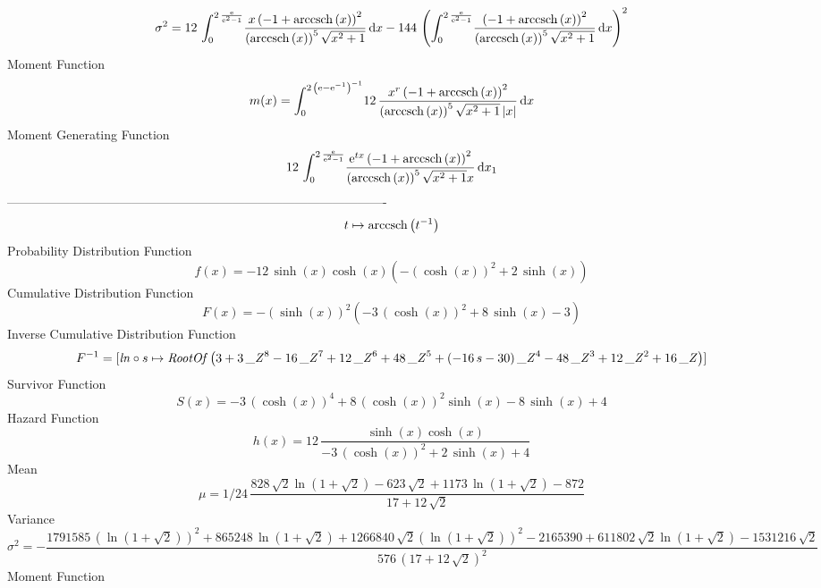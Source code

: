 \documentclass[12pt]{article}
\begin{document}
 $$ \sigma^2 = 12\,\int_{0}^{2\,{\frac {{\rm e}}{{{\rm e}^{2}}-1}}}\!{\frac {x
 \left( -1+{\rm arccsch} \left(x\right) \right) ^{2}}{ \left( 
{\rm arccsch} \left(x\right) \right) ^{5}\sqrt {{x}^{2}+1}}}\,{\rm d}x
-144\, \left( \int_{0}^{2\,{\frac {{\rm e}}{{{\rm e}^{2}}-1}}}\!{
\frac { \left( -1+{\rm arccsch} \left(x\right) \right) ^{2}}{ \left( 
{\rm arccsch} \left(x\right) \right) ^{5}\sqrt {{x}^{2}+1}}}\,{\rm d}x
 \right) ^{2}
$$Moment Function 
 $$ m(x) = \int_{0}^{2\, \left( {\rm e}-{{\rm e}^{-1}} \right) ^{-1}}\!12\,{
\frac {{x}^{r} \left( -1+{\rm arccsch} \left(x\right) \right) ^{2}}{
 \left( {\rm arccsch} \left(x\right) \right) ^{5}\sqrt {{x}^{2}+1}
 \left| x \right| }}\,{\rm d}x
$$ Moment Generating Function 
 $$12\,\int_{0}^{2\,{\frac {{\rm e}}{{{\rm e}^{2}}-1}}}\!{\frac {{{\rm e}
^{tx}} \left( -1+{\rm arccsch} \left(x\right) \right) ^{2}}{ \left( 
{\rm arccsch} \left(x\right) \right) ^{5}\sqrt {{x}^{2}+1}x}}\,{\rm d}
x_{{1}}
$$-------------------------------------------------------------------------------------------  \\$$t\mapsto {\rm arccsch} \left({t}^{-1}\right)
$$Probability Distribution Function 
$$  f(x)=-12\,\sinh \left( x \right) \cosh \left( x \right)  \left( - \left( 
\cosh \left( x \right)  \right) ^{2}+2\,\sinh \left( x \right) 
 \right) 
$$Cumulative Distribution Function  
 $$F(x)=- \left( \sinh \left( x \right)  \right) ^{2} \left( -3\, \left( \cosh
 \left( x \right)  \right) ^{2}+8\,\sinh \left( x \right) -3 \right) 
$$ Inverse Cumulative Distribution Function 
  $$F^{-1} = [{\it ln}\circ s\mapsto {\it RootOf} \left( 3+3\,{{\it \_Z}}^{8}-16\,{
{\it \_Z}}^{7}+12\,{{\it \_Z}}^{6}+48\,{{\it \_Z}}^{5}+ \left( -16\,s-
30 \right) {{\it \_Z}}^{4}-48\,{{\it \_Z}}^{3}+12\,{{\it \_Z}}^{2}+16
\,{\it \_Z} \right) ]
$$Survivor Function 
 $$ S(x)=-3\, \left( \cosh \left( x \right)  \right) ^{4}+8\, \left( \cosh
 \left( x \right)  \right) ^{2}\sinh \left( x \right) -8\,\sinh
 \left( x \right) +4
$$ Hazard Function 
 $$ h(x)=12\,{\frac {\sinh \left( x \right) \cosh \left( x \right) }{-3\,
 \left( \cosh \left( x \right)  \right) ^{2}+2\,\sinh \left( x
 \right) +4}}
$$Mean 
 $$ \mu=1/24\,{\frac {828\,\sqrt {2}\ln  \left( 1+\sqrt {2} \right) -623\,
\sqrt {2}+1173\,\ln  \left( 1+\sqrt {2} \right) -872}{17+12\,\sqrt {2}
}}
$$ Variance 
 $$ \sigma^2 = -{\frac {1791585\, \left( \ln  \left( 1+\sqrt {2} \right)  \right) ^{2
}+865248\,\ln  \left( 1+\sqrt {2} \right) +1266840\,\sqrt {2} \left( 
\ln  \left( 1+\sqrt {2} \right)  \right) ^{2}-2165390+611802\,\sqrt {2
}\ln  \left( 1+\sqrt {2} \right) -1531216\,\sqrt {2}}{576\, \left( 17+
12\,\sqrt {2} \right) ^{2}}}
$$Moment Function 
\end{document}
